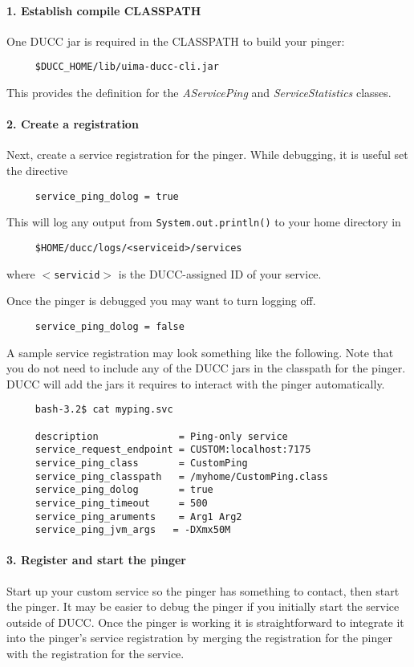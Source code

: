       \paragraph{1. Establish compile CLASSPATH} One DUCC jar is required in the CLASSPATH to build your pinger:
\begin{verbatim}
     $DUCC_HOME/lib/uima-ducc-cli.jar
\end{verbatim}      
      This provides the definition for the {\em AServicePing} and {\em ServiceStatistics} classes.

      \paragraph{2. Create a registration}Next, create a service registration for the pinger.  While
      debugging, it is useful set the directive
\begin{verbatim}
     service_ping_dolog = true
\end{verbatim}
      This will log any output from  {\tt System.out.println()} to your home directory in
\begin{verbatim}
     $HOME/ducc/logs/<serviceid>/services
\end{verbatim}
      where {\tt$<$servicid$>$} is the DUCC-assigned ID of your service.

      Once the pinger is debugged you may want to turn logging off.
\begin{verbatim}
     service_ping_dolog = false
\end{verbatim}
      
      A sample service registration may look something like the following.  Note that you do not need
      to include any of the DUCC jars in the classpath for the pinger.  DUCC will add the jars it
      requires to interact with the pinger automatically.
\begin{verbatim}
     bash-3.2$ cat myping.svc

     description              = Ping-only service
     service_request_endpoint = CUSTOM:localhost:7175
     service_ping_class       = CustomPing
     service_ping_classpath   = /myhome/CustomPing.class
     service_ping_dolog       = true
     service_ping_timeout     = 500
     service_ping_aruments    = Arg1 Arg2
     service_ping_jvm_args   = -DXmx50M
\end{verbatim}
       
      \paragraph{3. Register and start the pinger} Start up your custom service so the pinger has something to contact, then start
      the pinger.  It may be easier to debug the pinger if you initially start the service outside of DUCC. Once
      the pinger is working it is straightforward to integrate it into the pinger's service registration by merging
      the registration for the pinger with the registration for the service.

